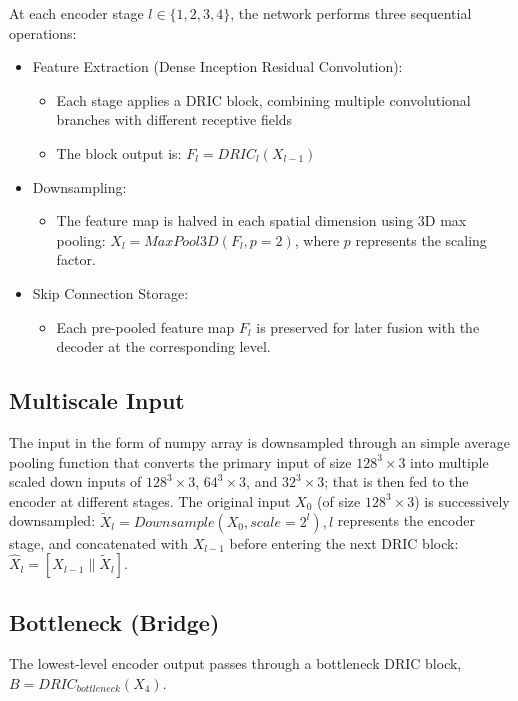 \documentclass[a4paper,fleqn]{cas-dc}
\begin{document}
At each encoder stage $l\in\{1,2,3,4\}$, the network performs three sequential operations:
\begin{itemize}
    \item Feature Extraction (Dense Inception Residual Convolution):
    \begin{itemize}
        \item Each stage applies a DRIC block, combining multiple convolutional branches with different receptive fields
        \item The block output is: $F_l = DRIC_l (X_{l-1})$
    \end{itemize}
    \item Downsampling:
    \begin{itemize}
        \item {\sloppy The feature map is halved in each spatial dimension using 3D max pooling: $X_l = MaxPool3D(F_l, p = 2)$, where $p$ represents the scaling factor.\par}
    \end{itemize}
    \item Skip Connection Storage:
    \begin{itemize}
        \item Each pre-pooled feature map $F_l$ is preserved for later fusion with the decoder at the corresponding level.
    \end{itemize}
\end{itemize}

\subsection{Multiscale Input}

The input in the form of numpy array is downsampled through an simple average pooling function that converts the primary input of size $128^3\times3$ into multiple scaled down inputs of $128^3\times3$, $64^3\times3$, and $32^3\times3$; that is then fed to the encoder at different stages.
The original input $X_0$ (of size $128^3\times3$) is successively downsampled:
$\tilde{X}_l=Downsample(X_0,scale=2^l), l$ represents the encoder stage, and concatenated with $X_{l-1}$ before entering the next DRIC block:
$\hat{X}_l=[X_{l-1} \| \tilde{X}_l]$.

\subsection{Bottleneck (Bridge)}

The lowest-level encoder output passes through a bottleneck DRIC block, $B = DRIC_{bottleneck}(X_4)$.
\end{document}
